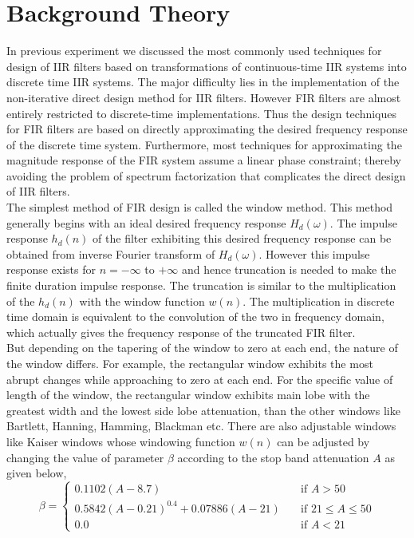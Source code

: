 \documentclass{lab_sheet}
\begin{document}
\section{Background Theory}
In previous experiment we discussed the most commonly used techniques for design of IIR filters based on transformations of continuous-time IIR systems into discrete time IIR systems. The major difficulty lies in the implementation of the non-iterative direct design method for IIR filters. However FIR filters are almost entirely restricted to discrete-time implementations. Thus the design techniques for FIR filters are based on directly approximating the desired frequency response of the discrete time system. Furthermore, most techniques for approximating the magnitude response of the FIR system assume a linear phase constraint; thereby avoiding the problem of spectrum factorization that complicates the direct design of IIR filters.\\ 
The simplest method of FIR design is called the window method. This method generally begins with an ideal desired frequency response $H_d(\omega)$. The impulse response $h_d(n)$ of the filter exhibiting this desired frequency response can be obtained from inverse Fourier transform of $H_d(\omega)$. However this impulse response exists for $n=-\infty$ to $+\infty$ and hence truncation is needed to make the finite duration impulse response. The truncation is similar to the multiplication of the $h_d(n)$ with the window function $w(n)$. The multiplication in discrete time domain is equivalent to the convolution of the two in frequency domain, which actually gives the frequency response of the truncated FIR filter.\\
But depending on the tapering of the window to zero at each end, the nature of the window differs. For example, the rectangular window exhibits the most abrupt changes while approaching to zero at each end. For the specific value of length of the window, the rectangular window exhibits main lobe with the greatest width and the lowest side lobe attenuation, than the other windows like Bartlett, Hanning, Hamming, Blackman etc. There are also adjustable windows like Kaiser windows whose windowing function $w(n)$ can be adjusted by changing the value of parameter $\beta$ according to the stop band attenuation $A$ as given below,
\begin{equation*}
    \beta=\begin{cases}
        0.1102(A-8.7)\quad &\text{if }A>50\\
        0.5842(A-0.21)^{0.4}+0.07886(A-21)\quad &\text{if }21\leq A \leq 50\\
        0.0 \quad &\text{if }A<21
    \end{cases}
\end{equation*}
\end{document}
